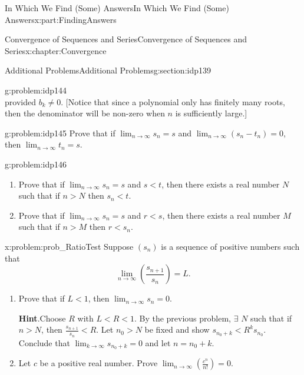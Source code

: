 \documentclass[oneside,10pt,]{book}
\newcommand{\blocktitlefont}{\relax}
\numberwithin{equation}{section}
\newcommand{\lt}{<}
\begin{document}
\begin{partptx}{In Which We Find (Some) Answers}{}{In Which We Find (Some) Answers}{}{}{x:part:FindingAnswers}
\begin{chapterptx}{Convergence of Sequences and Series}{}{Convergence of Sequences and Series}{}{}{x:chapter:Convergence}
\begin{sectionptx}{Additional Problems}{}{Additional Problems}{}{}{g:section:idp139}
\begin{problem}{}{g:problem:idp144}
\begin{equation*}
\end{equation*}
provided \(b_k\neq 0\). [Notice that since a polynomial only has finitely many roots, then the denominator will be non-zero when \(n\) is sufficiently large.]%
\end{problem}
\begin{problem}{}{g:problem:idp145}%
Prove that if \(\lim_{n\rightarrow\infty}s_n=s\) and \(\lim_{n\rightarrow\infty}\left(s_n-t_n\right)=0\), then \(\lim_{n\rightarrow\infty}t_n=s\).%
\end{problem}
\begin{problem}{}{g:problem:idp146}%
\begin{enumerate}[font=\bfseries,label=(\alph*),ref=\alph*]
\item{}Prove that if \(\lim_{n\rightarrow\infty}s_n=s\) and \(s\lt
t\), then there exists a real number \(N\) such that if \(n>N\) then \(s_n\lt t\).%
\item{}Prove that if \(\lim_{n\rightarrow\infty}s_n=s\) and \(r\lt
s\), then there exists a real number \(M\) such that if \(n>M\) then \(r\lt s_n\).%
\end{enumerate}
\end{problem}
\begin{problem}{}{x:problem:prob_RatioTest}%
Suppose \(\left(s_n\right)\) is a sequence of positive numbers such that%
\begin{equation*}
\lim_{n\rightarrow\infty}\left(\frac{s_{n+1}}{s_n}\right)=L\text{.}
\end{equation*}
%
\begin{enumerate}[font=\bfseries,label=(\alph*),ref=\alph*]
\item{}Prove that if \(L\lt 1\), then \(\lim_{n\rightarrow\infty}s_n=0\).%
\par\smallskip%
\noindent\textbf{\blocktitlefont Hint}.\hypertarget{g:hint:idp147}{}\quad{}Choose \(R\) with \(L\lt R\lt 1\).  By the previous problem, \(\exists\) \(N\) such that if \(n>N\), then \(\frac{s_{n+1}}{s_n}\lt R\).  Let \(n_0>N\) be fixed and show \(s_{n_0+k}\lt R^ks_{n_0}\). Conclude that \(\lim_{k\rightarrow\infty}s_{n_0+k}=0\) and let \(n=n_0+k\).%
\item{}Let \(c\) be a positive real number. Prove \(\displaystyle\lim_{n\rightarrow\infty}\left(\frac{c^n}{n!}\right)=0\).%
\end{enumerate}
\end{problem}
\end{sectionptx}
\end{chapterptx}
%
\typeout{************************************************}

\end{partptx}
\end{document}
